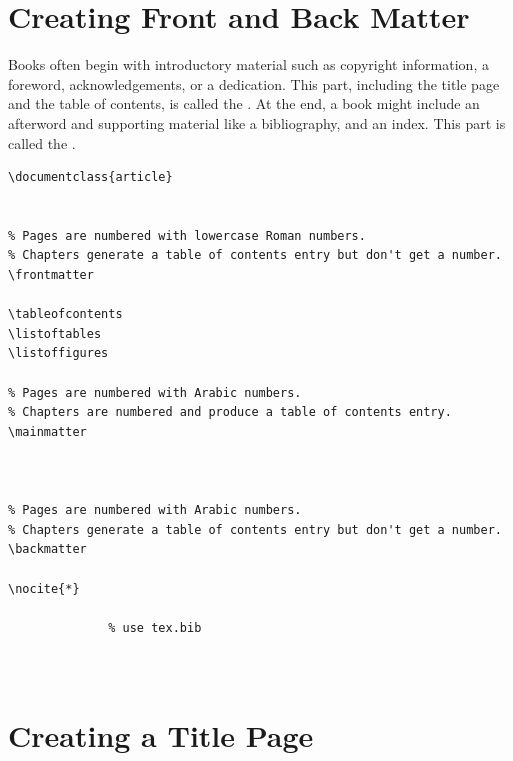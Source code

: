 \section{Creating Front and Back Matter}
\label{sec:creating-front-back}

Books often begin with introductory material such as copyright information, a foreword, acknowledgements, or a dedication. This part, including the title page and the table of contents, is called the .
At the end, a book might include an afterword and supporting material like a bibliography, and an index. This part is called the .


\begin{lstlisting}
\documentclass{article}


% Pages are numbered with lowercase Roman numbers.
% Chapters generate a table of contents entry but don't get a number.
\frontmatter 
 
\tableofcontents 
\listoftables
\listoffigures

% Pages are numbered with Arabic numbers.
% Chapters are numbered and produce a table of contents entry.
\mainmatter 
 
 

% Pages are numbered with Arabic numbers.
% Chapters generate a table of contents entry but don't get a number.
\backmatter
                
\nocite{*} 
 
              % use tex.bib



\end{lstlisting}

\section{Creating a Title Page}
\label{sec:creating-title-page}



